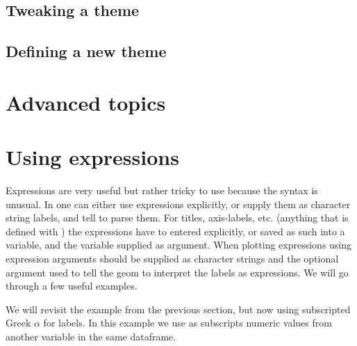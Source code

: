 \documentclass[paper=a4,headsepline,BCOR=12mm,twoside,open=right,%
titlepage,headings=small,fontsize=10pt,index=totoc,bibliography=totoc,%
captions=tableheading,captions=nooneline]{scrbook}\usepackage{knitr}
\begin{document}
\subsection{Tweaking a theme}
\subsection{Defining a new theme}

\section{Advanced topics}

\section{Using  expressions}

Expressions are very useful but rather tricky to use because the syntax is unusual. In  one can either use expressions explicitly, or supply them as character string labels, and tell  to parse them. For titles, axis-labels, etc. (anything that is defined with ) the expressions have to entered explicitly, or saved as such into a variable, and the variable supplied as argument. When plotting expressions using  expression arguments should be supplied as character strings and the optional argument  used to tell the geom to interpret the labels as expressions. We will go through a few useful examples.

We will revisit the example from the previous section, but now using subscripted Greek $\alpha$ for labels. In this example we use as subscripts numeric values from another variable in the same dataframe.
\end{document}
